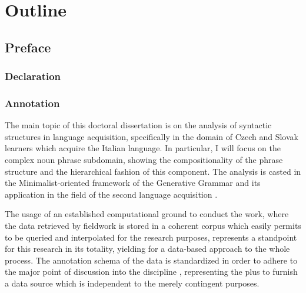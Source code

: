 \documentclass[
  a4paper,
  twoside,
  12pt,
  chapterprefix=false,
  bibliography=totocnumbered,
  listof=flat]{scrbook}
\begin{document}
{
\setcounter{tocdepth}{4}
\tableofcontents
}
\listoftables
\listoffigures
\part{Outline}

\hypertarget{preface}{%
\chapter*{Preface}\label{preface}}

\hypertarget{declaration}{%
\section*{Declaration}\label{declaration}}

\newpage

\hypertarget{annotation}{%
\section*{Annotation}\label{annotation}}

The main topic of this doctoral dissertation is on the analysis of syntactic structures in language acquisition, specifically in the domain of Czech and Slovak learners which acquire the Italian language. In particular, I will focus on the complex noun phrase subdomain, showing the compositionality of the phrase structure and the hierarchical fashion of this component.
The analysis is casted in the Minimalist-oriented framework of the Generative Grammar \citep{chomsky1995, chomsky1998, chomsky2013, hcf2002} and its application in the field of the second language acquisition \citep{rothmanslabakova2017, slabakovalealliskin2014}.

The usage of an established computational ground to conduct the work, where the data retrieved by fieldwork is stored in a coherent corpus which easily permits to be queried and interpolated for the research purposes, represents a standpoint for this research in its totality, yielding for a data-based approach to the whole process.
The annotation schema of the data is standardized in order to adhere to the major point of discussion into the discipline \citep{clark2010, kueblerzinsmeinster2015, kurdi2016}, representing the plus to furnish a data source which is independent to the merely contingent purposes.
\end{document}
